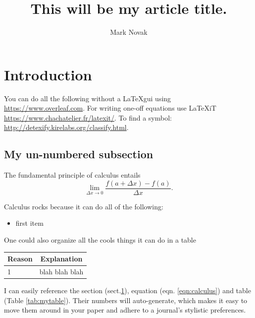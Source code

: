 \documentclass[12pt,letterpaper]{article}
\author{Mark Novak}
\title{This will be my article title.}
\begin{document}
\maketitle

\tableofcontents %

\pagebreak

\section{Introduction } \label{sec:intro} %

You can do all the following without a \LaTeX gui using \url{https://www.overleaf.com}.  For writing one-off equations use LaTeXiT \url{https://www.chachatelier.fr/latexit/}.  To find a symbol:  \url{http://detexify.kirelabs.org/classify.html}.

\subsection*{My un-numbered subsection}

The fundamental principle of calculus entails
\begin{equation}
	\label{eqn:calculus}
	\lim_{{\Delta x} \to 0}\frac{f(a+\Delta x)-f(a)}{\Delta x}.
\end{equation}

\noindent %
Calculus rocks because it can do all of the following:
\begin{itemize} 
	\item first item
\end{itemize}

One could also organize all the cools things it can do in a table
\begin{center}
\begin{tabular}{l c} %
	\label{tab:mytable}
		Reason & Explanation\\ %
		 \hline
		1 & blah blah blah \\ 
 		 \hline
\end{tabular}
\end{center}

I can easily reference the section (sect.\ref{sec:intro}), equation (eqn. \ref{eqn:calculus}) and table (Table \ref{tab:mytable}).  Their numbers will auto-generate, which makes it easy to move them around in your paper and adhere to a journal's stylistic preferences.
\end{document}
